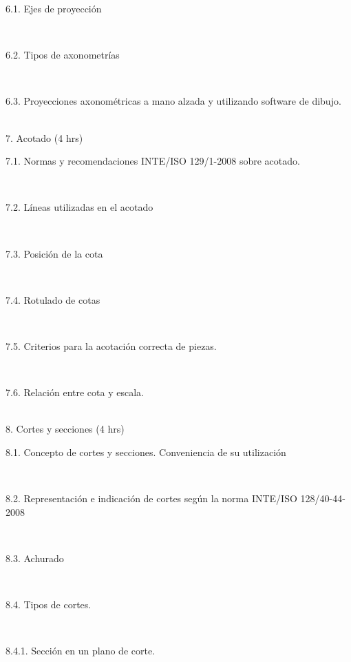 \documentclass[letterpaper]{article}%
\begin{document}
\begin{tcolorbox}
\hspace*{0.02\linewidth}\parbox{0.98\linewidth}{\strut 6.1. Ejes de proyección\strut}\\
\hspace*{0.02\linewidth}\parbox{0.98\linewidth}{\strut 6.2. Tipos de axonometrías\strut}\\
\hspace*{0.02\linewidth}\parbox{0.98\linewidth}{\strut 6.3. Proyecciones axonométricas a mano alzada y utilizando software de dibujo.\strut}\\
7. Acotado (4 hrs) \\
\hspace*{0.02\linewidth}\parbox{0.98\linewidth}{\strut 7.1. Normas y recomendaciones INTE/ISO 129/1-2008 sobre acotado.\strut}\\
\hspace*{0.02\linewidth}\parbox{0.98\linewidth}{\strut 7.2. Líneas utilizadas en el acotado\strut}\\
\hspace*{0.02\linewidth}\parbox{0.98\linewidth}{\strut 7.3. Posición de la cota\strut}\\
\hspace*{0.02\linewidth}\parbox{0.98\linewidth}{\strut 7.4. Rotulado de cotas\strut}\\
\hspace*{0.02\linewidth}\parbox{0.98\linewidth}{\strut 7.5. Criterios para la acotación correcta de piezas.\strut}\\
\hspace*{0.02\linewidth}\parbox{0.98\linewidth}{\strut 7.6. Relación entre cota y escala.\strut}\\
8. Cortes y secciones (4 hrs)\\
\hspace*{0.02\linewidth}\parbox{0.98\linewidth}{\strut 8.1. Concepto de cortes y secciones. Conveniencia de su utilización\strut}\\
\hspace*{0.02\linewidth}\parbox{0.98\linewidth}{\strut 8.2. Representación e indicación de cortes según la norma INTE/ISO 128/40-44- 2008\strut}\\
\hspace*{0.02\linewidth}\parbox{0.98\linewidth}{\strut 8.3. Achurado\strut}\\
\hspace*{0.02\linewidth}\parbox{0.98\linewidth}{\strut 8.4. Tipos de cortes.\strut}\\
\hspace*{0.04\linewidth}\parbox{0.96\linewidth}{\strut 8.4.1. Sección en un plano de corte.\strut}\\

\end{tcolorbox}
\end{document}
